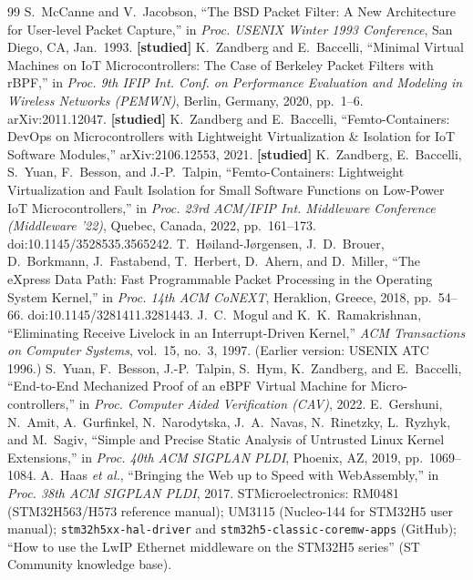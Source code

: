 \documentclass[10pt,a4paper]{article}
\begin{document}
\begin{thebibliography}{99}\small
{} S.~McCanne and V.~Jacobson, ``The BSD Packet Filter: A New Architecture for User-level Packet Capture,'' in \emph{Proc. USENIX Winter 1993 Conference}, San Diego, CA, Jan.\ 1993. \textbf{[studied]}
 K.~Zandberg and E.~Baccelli, ``Minimal Virtual Machines on IoT Microcontrollers: The Case of Berkeley Packet Filters with rBPF,'' in \emph{Proc. 9th IFIP Int. Conf. on Performance Evaluation and Modeling in Wireless Networks (PEMWN)}, Berlin, Germany, 2020, pp.~1--6. arXiv:2011.12047. \textbf{[studied]}
 K.~Zandberg and E.~Baccelli, ``Femto-Containers: DevOps on Microcontrollers with Lightweight Virtualization \& Isolation for IoT Software Modules,'' arXiv:2106.12553, 2021. \textbf{[studied]}
 K.~Zandberg, E.~Baccelli, S.~Yuan, F.~Besson, and J.-P.~Talpin, ``Femto-Containers: Lightweight Virtualization and Fault Isolation for Small Software Functions on Low-Power IoT Microcontrollers,'' in \emph{Proc. 23rd ACM/IFIP Int. Middleware Conference (Middleware '22)}, Quebec, Canada, 2022, pp.~161--173. doi:10.1145/3528535.3565242.
 T.~Høiland-Jørgensen, J.~D.~Brouer, D.~Borkmann, J.~Fastabend, T.~Herbert, D.~Ahern, and D.~Miller, ``The eXpress Data Path: Fast Programmable Packet Processing in the Operating System Kernel,'' in \emph{Proc. 14th ACM CoNEXT}, Heraklion, Greece, 2018, pp.~54--66. doi:10.1145/3281411.3281443.
 J.~C.~Mogul and K.~K.~Ramakrishnan, ``Eliminating Receive Livelock in an Interrupt-Driven Kernel,'' \emph{ACM Transactions on Computer Systems}, vol.~15, no.~3, 1997. (Earlier version: USENIX ATC 1996.)
 S.~Yuan, F.~Besson, J.-P.~Talpin, S.~Hym, K.~Zandberg, and E.~Baccelli, ``End-to-End Mechanized Proof of an eBPF Virtual Machine for Micro-controllers,'' in \emph{Proc. Computer Aided Verification (CAV)}, 2022.
 E.~Gershuni, N.~Amit, A.~Gurfinkel, N.~Narodytska, J.~A.~Navas, N.~Rinetzky, L.~Ryzhyk, and M.~Sagiv, ``Simple and Precise Static Analysis of Untrusted Linux Kernel Extensions,'' in \emph{Proc. 40th ACM SIGPLAN PLDI}, Phoenix, AZ, 2019, pp.~1069--1084.
 A.~Haas \emph{et al.}, ``Bringing the Web up to Speed with WebAssembly,'' in \emph{Proc. 38th ACM SIGPLAN PLDI}, 2017.
 STMicroelectronics: RM0481 (STM32H563/H573 reference manual); UM3115 (Nucleo-144 for STM32H5 user manual); \texttt{stm32h5xx-hal-driver} and \texttt{stm32h5-classic-coremw-apps} (GitHub); ``How to use the LwIP Ethernet middleware on the STM32H5 series'' (ST Community knowledge base).
\end{thebibliography}
\end{document}
